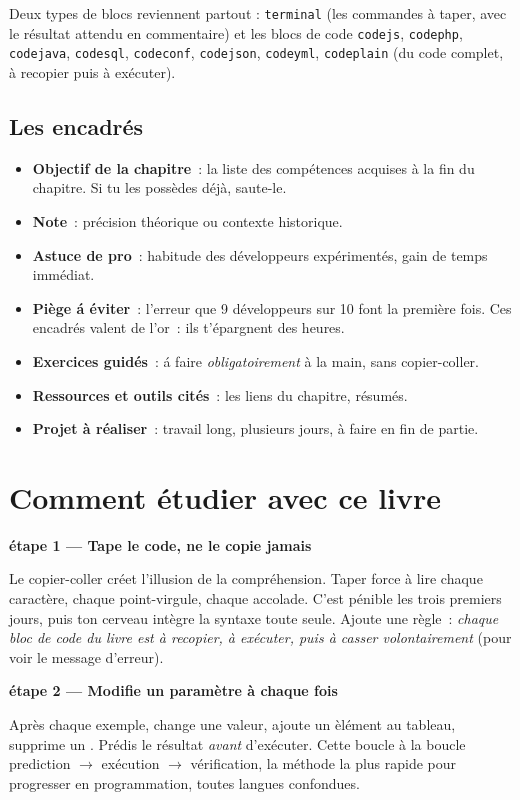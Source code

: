 \documentclass[12pt,a4paper,twoside,openright]{book}
\providecommand{\cmd}[1]{}%
\renewcommand{\cmd}[1]{\srcbox{\texttt{\detokenize{#1}}}}
\newcommand{\etape}[1]{\par\medskip\noindent\textbf{\large #1}\par\smallskip}
\begin{document}
Deux types de blocs reviennent partout : \verb|terminal| (les commandes \`a taper, avec le
r\'esultat attendu en commentaire) et les blocs de code \verb|codejs|, \verb|codephp|,
\verb|codejava|, \verb|codesql|, \verb|codeconf|, \verb|codejson|, \verb|codeyml|,
\verb|codeplain| (du code complet, \`a recopier puis \`a ex\'ecuter).

\subsection{Les encadr\'es}

\begin{itemize}
  \item \textbf{Objectif de la chapitre}~: la liste des comp\'etences acquises \`a la fin du chapitre.
        Si tu les poss\`edes d\'ej\`a, saute-le.
  \item \textbf{Note}~: pr\'ecision th\'eorique ou contexte historique.
  \item \textbf{Astuce de pro}~: habitude des d\'eveloppeurs exp\'eriment\'es, gain de temps imm\'ediat.
  \item \textbf{Pi\`ege \'a \'eviter}~: l'erreur que 9 d\'eveloppeurs sur 10 font la premi\`ere fois.
        Ces encadr\'es valent de l'or~: ils t'\'epargnent des heures.
  \item \textbf{Exercices guid\'es}~: \'a faire \emph{obligatoirement} \`a la main, sans copier-coller.
  \item \textbf{Ressources et outils cit\'es}~: les liens du chapitre, r\'esum\'es.
  \item \textbf{Projet \`a r\'ealiser}~: travail long, plusieurs jours, \`a faire en fin de partie.
\end{itemize}

\section{Comment \'etudier avec ce livre}

\etape{\'etape 1 --- Tape le code, ne le copie jamais}
Le copier-coller cr\'eet l'illusion de la compr\'ehension. Taper force \`a lire chaque caract\`ere,
chaque point-virgule, chaque accolade. C'est p\'enible les trois premiers jours, puis
ton cerveau int\`egre la syntaxe toute seule. Ajoute une r\`egle~:
\emph{chaque bloc de code du livre est \`a recopier, \`a ex\'ecuter, puis \`a casser volontairement}
(pour voir le message d'erreur).

\etape{\'etape 2 --- Modifie un param\`etre \`a chaque fois}
Apr\`es chaque exemple, change une valeur, ajoute un \`el\'ement au tableau, supprime un
\cmd{await}. Pr\'edis le r\'esultat \emph{avant} d'ex\'ecuter. Cette boucle
\`a la boucle \og prediction $\rightarrow$ ex\'ecution $\rightarrow$ v\'erification\fg{}, la m\'ethode la plus rapide
pour progresser en programmation, toutes langues confondues.
\end{document}
